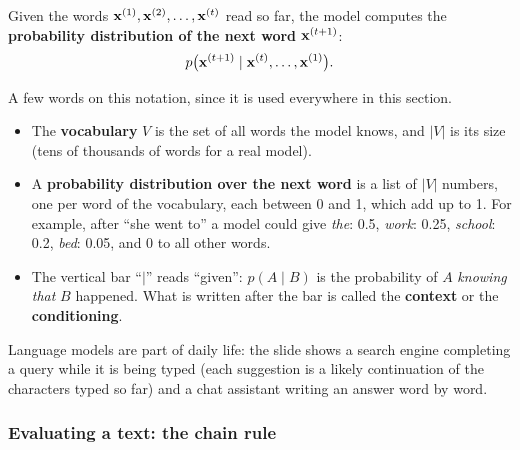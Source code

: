 \begin{center}
\end{center}

Given the words $\mathbf{x}^{(1)}, \mathbf{x}^{(2)}, \ldots, \mathbf{x}^{(t)}$ read so far, the
model computes the \textbf{probability distribution of the next word}
$\mathbf{x}^{(t+1)}$:
\[
  p\bigl(\mathbf{x}^{(t+1)} \mid \mathbf{x}^{(t)}, \ldots, \mathbf{x}^{(1)}\bigr).
\]

\notinslides
A few words on this notation, since it is used everywhere in this section.
\begin{itemize}[nosep]
  \item The \textbf{vocabulary} $V$ is the set of all words the model knows, and $|V|$
        is its size (tens of thousands of words for a real model).
  \item A \textbf{probability distribution over the next word} is a list of $|V|$
        numbers, one per word of the vocabulary, each between 0 and 1, which add up to
        1. For example, after ``she went to'' a model could give \emph{the}: 0.5,
        \emph{work}: 0.25, \emph{school}: 0.2, \emph{bed}: 0.05, and 0 to all other
        words.
  \item The vertical bar ``$\mid$'' reads ``given'':
        $p(A \mid B)$ is the probability of $A$ \emph{knowing that} $B$ happened.
        What is written after the bar is called the \textbf{context} or the
        \textbf{conditioning}.
\end{itemize}

Language models are part of daily life: the slide shows a search engine completing a
query while it is being typed (each suggestion is a likely continuation of the
characters typed so far) and a chat assistant writing an answer word by word.

\subsubsection{Evaluating a text: the chain rule}

